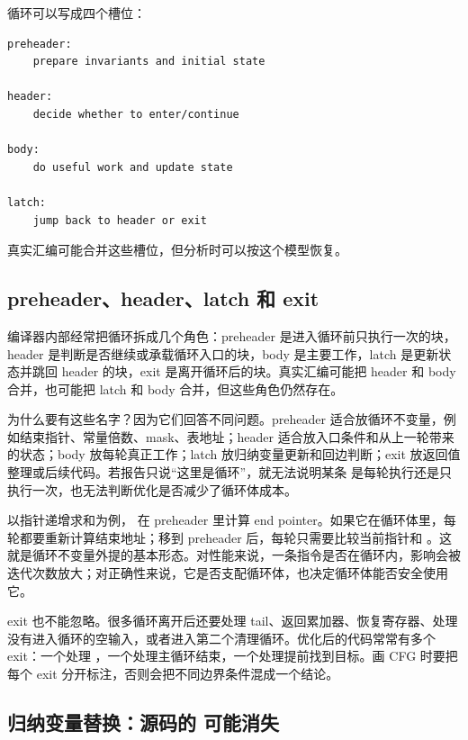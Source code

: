 \begin{mentalmodel}
循环可以写成四个槽位：

\begin{lstlisting}
preheader:
    prepare invariants and initial state

header:
    decide whether to enter/continue

body:
    do useful work and update state

latch:
    jump back to header or exit
\end{lstlisting}

真实汇编可能合并这些槽位，但分析时可以按这个模型恢复。
\end{mentalmodel}

\subsection{preheader、header、latch 和 exit}

编译器内部经常把循环拆成几个角色：preheader 是进入循环前只执行一次的块，header 是判断是否继续或承载循环入口的块，body 是主要工作，latch 是更新状态并跳回 header 的块，exit 是离开循环后的块。真实汇编可能把 header 和 body 合并，也可能把 latch 和 body 合并，但这些角色仍然存在。

为什么要有这些名字？因为它们回答不同问题。preheader 适合放循环不变量，例如结束指针、常量倍数、mask、表地址；header 适合放入口条件和从上一轮带来的状态；body 放每轮真正工作；latch 放归纳变量更新和回边判断；exit 放返回值整理或后续代码。若报告只说“这里是循环”，就无法说明某条  是每轮执行还是只执行一次，也无法判断优化是否减少了循环体成本。

以指针递增求和为例， 在 preheader 里计算 end pointer。如果它在循环体里，每轮都要重新计算结束地址；移到 preheader 后，每轮只需要比较当前指针和 。这就是循环不变量外提的基本形态。对性能来说，一条指令是否在循环内，影响会被迭代次数放大；对正确性来说，它是否支配循环体，也决定循环体能否安全使用它。

exit 也不能忽略。很多循环离开后还要处理 tail、返回累加器、恢复寄存器、处理没有进入循环的空输入，或者进入第二个清理循环。优化后的代码常常有多个 exit：一个处理 ，一个处理主循环结束，一个处理提前找到目标。画 CFG 时要把每个 exit 分开标注，否则会把不同边界条件混成一个结论。

\subsection{归纳变量替换：源码的  可能消失}

